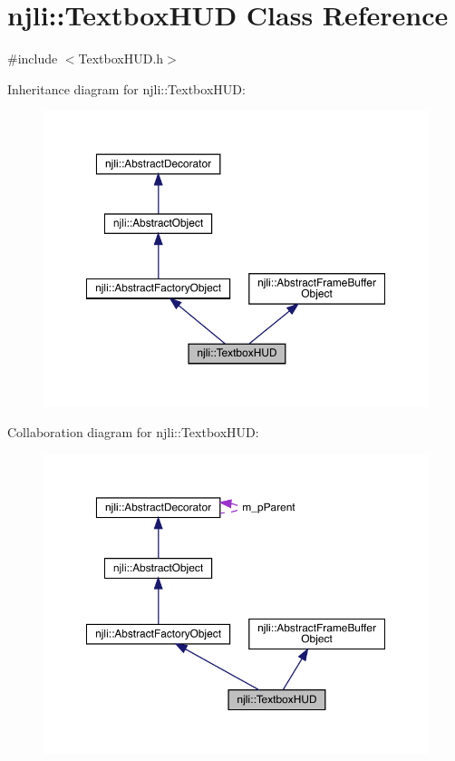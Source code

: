 \hypertarget{classnjli_1_1_textbox_h_u_d}{}\section{njli\+:\+:Textbox\+H\+UD Class Reference}
\label{classnjli_1_1_textbox_h_u_d}


{\ttfamily \#include $<$Textbox\+H\+U\+D.\+h$>$}



Inheritance diagram for njli\+:\+:Textbox\+H\+UD\+:\nopagebreak
\begin{figure}[H]
\begin{center}
\leavevmode
\includegraphics[width=350pt]{classnjli_1_1_textbox_h_u_d__inherit__graph}
\end{center}
\end{figure}


Collaboration diagram for njli\+:\+:Textbox\+H\+UD\+:\nopagebreak
\begin{figure}[H]
\begin{center}
\leavevmode
\includegraphics[width=350pt]{classnjli_1_1_textbox_h_u_d__coll__graph}
\end{center}
\end{figure}
